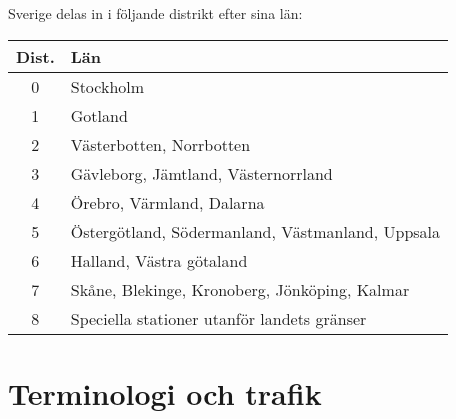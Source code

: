 Sverige delas in i följande distrikt efter sina län:

\begin{center}
\begin{tabular}{cl}
	\textbf{Dist.} & \textbf{Län}                                     \\ \hline
	      0        & Stockholm                                        \\
	      1        & Gotland                                          \\
	      2        & Västerbotten, Norrbotten                         \\
	      3        & Gävleborg, Jämtland, Västernorrland              \\
	      4        & Örebro, Värmland, Dalarna                        \\
	      5        & Östergötland, Södermanland, Västmanland, Uppsala \\
	      6        & Halland, Västra götaland                         \\
	      7        & Skåne, Blekinge, Kronoberg, Jönköping, Kalmar    \\
	      8        & Speciella stationer utanför landets gränser
\end{tabular}
\end{center}

\section{Terminologi och trafik}
